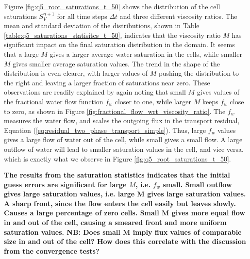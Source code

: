 Figure \ref{fig:q5_root_saturations_t_50} shows the distribution of the cell saturations $S_V^{n+1}$ for all time steps $\Delta t$ and three different viscosity ratios. The mean and standard deviation of the distributions, shown in Table \ref{table:q5_saturations_statisitcs_t_50}, indicates that the viscosity ratio $M$ has significant impact on the final saturation distribution in the domain. It seems that a large $M$ gives a larger average water saturation in the cells, while smaller $M$ gives smaller average saturation values. The trend in the shape of the distribution is even clearer, with larger values of $M$ pushing the distribution to the right and leaving a larger fraction of saturations near zero. These observations are readily explained by again noting that small $M$ gives values of the fractional water flow function $f_w$ closer to one, while larger $M$ keeps $f_w$ close to zero, as shown in Figure \ref{fig:fractional_flow_wrt_viscosity_ratio}. The $f_w$ measures the water flow, and scales the outgoing flux in the transport residual, Equation (\ref{eq:residual_two_phase_transport_simple}). Thus, large $f_w$ values gives a large flow of water out of the cell, while small gives a small flow. A large outflow of water will lead to smaller saturation values in the cell, and vice versa, which is exactly what we observe in Figure \ref{fig:q5_root_saturations_t_50}.



\textbf{The results from the saturation statistics indicates that the initial guess errors are significant for large $M$, i.e. $f_w$ small. Small outflow gives large saturation values, i.e. large M gives large saturation values. A sharp front, since the flow enters the cell easily but leaves slowly. Causes a large percentage of zero cells. Small M gives more equal flow in and out of the cell, causing a smeared front and more uniform saturation values. NB: Does small M imply flux values of comparable size in and out of the cell?  How does this correlate with the discussion from the convergence tests?}




\clearpage
